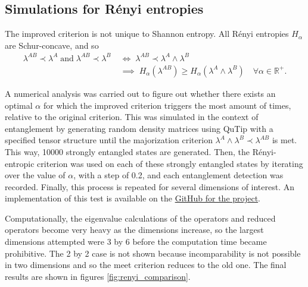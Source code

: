 \subsection{Simulations for R\'enyi entropies}

The improved criterion is not unique to Shannon entropy. All Rényi entropies $H_\alpha$ are Schur-concave, and so
\begin{align}
    \lambda^{AB} \prec \lambda^A \; \text{and} \; \lambda^{AB} \prec \lambda^{B} \; &\iff \; \lambda^{AB} \prec \lambda^A \wedge \lambda^B \;\\ &\implies \; H_\alpha(\lambda^{AB}) \geq H_\alpha(\lambda^A \wedge \lambda^B) \quad \forall \alpha \in \mathbb{R}^+.
\end{align}

A numerical analysis was carried out to figure out whether there exists an optimal $\alpha$ for which the improved criterion triggers the most amount of times, relative to the original criterion. This was simulated in the context of entanglement by generating random density matrices using QuTip with a specified tensor structure until the majorization criterion $\lambda^A \wedge \lambda^B \prec \lambda^{AB}$ is met. This way, 10000 strongly entangled states are generated. Then, the Rényi-entropic criterion was used on each of these strongly entangled states by iterating over the value of $\alpha$, with a step of 0.2, and each entanglement detection was recorded. Finally, this process is repeated for several dimensions of interest. An implementation of this test is available on the \href{https://github.com/traaldbjerg/MajoLat}{GitHub for the project}.

Computationally, the eigenvalue calculations of the operators and reduced operators become very heavy as the dimensions increase, so the largest dimensions attempted were 3 by 6 before the computation time became prohibitive. The 2 by 2 case is not shown because incomparability is not possible in two dimensions and so the meet criterion reduces to the old one. The final results are shown in figures \ref{fig:renyi_comparison}.


